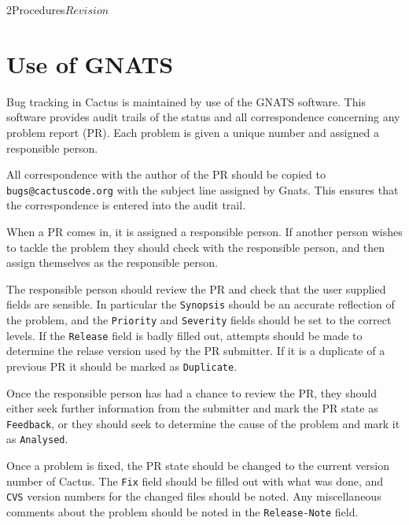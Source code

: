 \begin{cactuspart}{2}{Procedures}{}{$Revision$}

\chapter{Use of GNATS}

Bug tracking in Cactus is maintained by use of the GNATS software.
This software provides audit trails of the status and all
correspondence concerning any problem report (PR).  Each problem is
given a unique number and assigned a responsible person.

\begin{Lentry}
\item[{\em Correspondence}]
All correspondence with the author of the PR should be copied to {\tt
\verb,bugs@cactuscode.org,} with the subject line assigned by Gnats.
This ensures that the correspondence is entered into the audit trail.
\item[{\em Responsiblity}]
When a PR comes in, it is assigned a responsible person.  If another
person wishes to tackle the problem they should check with the
responsible person, and then assign themselves as the responsible
person.
\item[{\em Initial auditing}]
The responsible person should review the PR and check that the user
supplied fields are sensible.  In particular the {\tt Synopsis} should
be an accurate reflection of the problem, and the {\tt Priority} and
{\tt Severity} fields should be set to the correct levels.  If the
{\tt Release} field is badly filled out, attempts should be made to
determine the relase version used by the PR submitter.  If it is a
duplicate of a previous PR it should be marked as {\tt Duplicate}.
\item[{\em Analysing the PR}]
Once the responsible person has had a chance to review the PR, they
should either seek further information from the submitter and mark the 
PR state as {\tt Feedback}, or they should seek to determine the cause 
of the problem and mark it as {\tt Analysed}.
\item[{\em Closing a PR}]
Once a problem is fixed, the PR state should be changed to the current 
version number of Cactus.  The {\tt Fix} field should be filled out
with what was done, and {\tt CVS} version numbers for the changed
files should be noted.  Any miscellaneous comments about the problem
should be noted in the {\tt Release-Note} field.
\end{Lentry}



\end{cactuspart}
